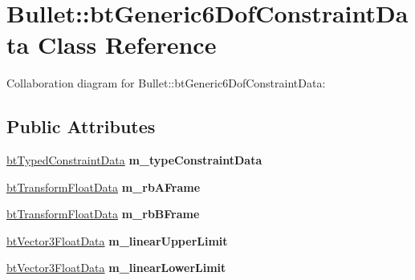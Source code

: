 \hypertarget{class_bullet_1_1bt_generic6_dof_constraint_data}{\section{Bullet\+:\+:bt\+Generic6\+Dof\+Constraint\+Data Class Reference}
\label{class_bullet_1_1bt_generic6_dof_constraint_data}
}


Collaboration diagram for Bullet\+:\+:bt\+Generic6\+Dof\+Constraint\+Data\+:
\subsection*{Public Attributes}
\begin{DoxyCompactItemize}
\item 
\hypertarget{class_bullet_1_1bt_generic6_dof_constraint_data_a5297fefae467206d64b2dd05f0ed5ee4}{\hyperlink{class_bullet_1_1bt_typed_constraint_data}{bt\+Typed\+Constraint\+Data} {\bfseries m\+\_\+type\+Constraint\+Data}}\label{class_bullet_1_1bt_generic6_dof_constraint_data_a5297fefae467206d64b2dd05f0ed5ee4}

\item 
\hypertarget{class_bullet_1_1bt_generic6_dof_constraint_data_aceb051013b02d1289cb56ba0b7bb3d39}{\hyperlink{class_bullet_1_1bt_transform_float_data}{bt\+Transform\+Float\+Data} {\bfseries m\+\_\+rb\+A\+Frame}}\label{class_bullet_1_1bt_generic6_dof_constraint_data_aceb051013b02d1289cb56ba0b7bb3d39}

\item 
\hypertarget{class_bullet_1_1bt_generic6_dof_constraint_data_a75b42d6a1857219346636dd8cf47fe37}{\hyperlink{class_bullet_1_1bt_transform_float_data}{bt\+Transform\+Float\+Data} {\bfseries m\+\_\+rb\+B\+Frame}}\label{class_bullet_1_1bt_generic6_dof_constraint_data_a75b42d6a1857219346636dd8cf47fe37}

\item 
\hypertarget{class_bullet_1_1bt_generic6_dof_constraint_data_ada91ce5a07c0d070191706b2195f6cf3}{\hyperlink{class_bullet_1_1bt_vector3_float_data}{bt\+Vector3\+Float\+Data} {\bfseries m\+\_\+linear\+Upper\+Limit}}\label{class_bullet_1_1bt_generic6_dof_constraint_data_ada91ce5a07c0d070191706b2195f6cf3}

\item 
\hypertarget{class_bullet_1_1bt_generic6_dof_constraint_data_ae016c2659a53470374d34304dface999}{\hyperlink{class_bullet_1_1bt_vector3_float_data}{bt\+Vector3\+Float\+Data} {\bfseries m\+\_\+linear\+Lower\+Limit}}\label{class_bullet_1_1bt_generic6_dof_constraint_data_ae016c2659a53470374d34304dface999}


\end{DoxyCompactItemize}
